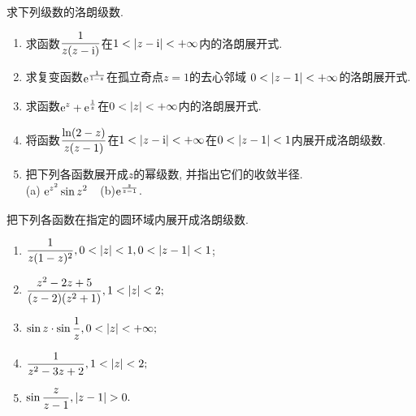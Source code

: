 \begin{yyEx}
	求下列级数的洛朗级数.
	\begin{enumerate}
		\item 求函数$\begin{lgathered}
			\frac{1}{z(z-\mathrm{i})}
		\end{lgathered}$在$1<\lvert z-\mathrm{i}\rvert<+\infty$内的洛朗展开式.
		\item 求复变函数$\begin{lgathered}
			\mathrm{e}^{\frac{1}{1-z}}
		\end{lgathered}$在孤立奇点$z = 1$的去心邻域 $0<\lvert z-1\rvert<+\infty$的洛朗展开式.
		\item 求函数$\begin{lgathered}
			\mathrm{e}^z+\mathrm{e}^{\frac{1}{z}}
		\end{lgathered}$在$0<\lvert z\rvert<+\infty$内的洛朗展开式.
		\item 将函数$\begin{lgathered}
		\frac{\ln (2-z)}{z(z-1)}
		\end{lgathered}$在$1<\lvert z-\mathrm{i}\rvert<+\infty$在$0<\lvert z-1\rvert<1$内展开成洛朗级数.
		\item 把下列各函数展开成$z$的幂级数, 并指出它们的收敛半径.\\
		(a) $\begin{lgathered}
			\mathrm{e}^{z^2}\sin z^2
		\end{lgathered}$~~(b)$\begin{lgathered}
		\mathrm{e}^{\frac{z}{z-1}}
		\end{lgathered}$.
	\end{enumerate}
\end{yyEx}

\begin{yyEx}
	把下列各函数在指定的圆环域内展开成洛朗级数.
	\begin{enumerate}
		\item $\begin{lgathered}
			\frac{1}{z(1-z)^2},0<\abs{z}<1,0<\abs{z-1}<1
		\end{lgathered}$;
		\item $\begin{lgathered}
		\frac{z^2-2z+5}{(z-2)(z^2+1)},1<\abs{z}<2;
		\end{lgathered}$
		\item $\begin{lgathered}
		\sin z\cdot \sin\frac{1}{z},0<\abs{z}<+\infty;
		\end{lgathered}$
		\item $\begin{lgathered}
		\frac{1}{z^2-3z+2},1<\abs{z}<2;
		\end{lgathered}$
		\item $\begin{lgathered}
		\sin\frac{z}{z-1},\abs{z-1}>0.
		\end{lgathered}$
	\end{enumerate}
\end{yyEx}

